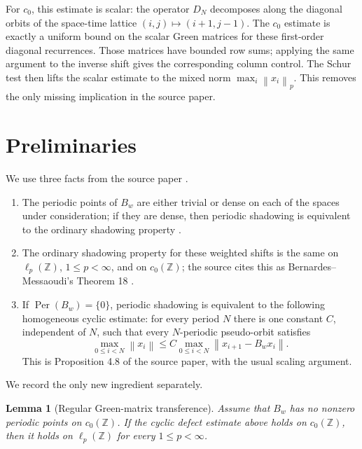 \documentclass[11pt]{amsart}
\newtheorem{lemma}{Lemma}
\theoremstyle{remark}
\newcommand{\Z}{\mathbb Z}
\newcommand{\norm}[1]{\left\|#1\right\|}
\newcommand{\Per}{\operatorname{Per}}
\begin{document}
For \(c_0\), this estimate is scalar: the operator \(D_N\) decomposes along the diagonal orbits of the space-time lattice \((i,j)\mapsto(i+1,j-1)\).  The \(c_0\) estimate is exactly a uniform bound on the scalar Green matrices for these first-order diagonal recurrences.  Those matrices have bounded row sums; applying the same argument to the inverse shift gives the corresponding column control.  The Schur test then lifts the scalar estimate to the mixed norm \(\max_i\norm{x_i}_{p}\).  This removes the only missing implication in the source paper.

\section{Preliminaries}

We use three facts from the source paper \cite{HR2025}.

\begin{enumerate}
\item The periodic points of \(B_w\) are either trivial or dense on each of the spaces under consideration; if they are dense, then periodic shadowing is equivalent to the ordinary shadowing property \cite[Proposition 4.5]{HR2025}.
\item The ordinary shadowing property for these weighted shifts is the same on \(\ell_p(\Z)\), \(1\leq p<\infty\), and on \(c_0(\Z)\); the source cites this as Bernardes--Messaoudi's Theorem 18 \cite{BM2021}.
\item If \(\Per(B_w)=\{0\}\), periodic shadowing is equivalent to the following homogeneous cyclic estimate: for every period \(N\) there is one constant \(C\), independent of \(N\), such that every \(N\)-periodic pseudo-orbit satisfies
\[
 \max_{0\leq i<N}\norm{x_i}\leq C
 \max_{0\leq i<N}\norm{x_{i+1}-B_wx_i}.
\]
This is Proposition 4.8 of the source paper, with the usual scaling argument.
\end{enumerate}

We record the only new ingredient separately.

\begin{lemma}[Regular Green-matrix transference]\label{l:transfer}
Assume that \(B_w\) has no nonzero periodic points on \(c_0(\Z)\).  If the cyclic defect estimate above holds on \(c_0(\Z)\), then it holds on \(\ell_p(\Z)\) for every \(1\leq p<\infty\).
\end{lemma}
\end{document}
